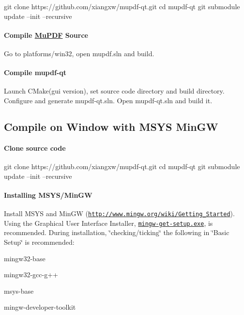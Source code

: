 \begin{DoxyVerb}git clone https://github.com/xiangxw/mupdf-qt.git
cd mupdf-qt
git submodule update --init --recursive
\end{DoxyVerb}


\paragraph*{Compile \hyperlink{namespace_mu_p_d_f}{Mu\-P\-D\-F} Source}

Go to platforms/win32, open mupdf.\-sln and build.

\paragraph*{Compile mupdf-\/qt}

Launch C\-Make(gui version), set source code directory and build directory. Configure and generate mupdf-\/qt.\-sln. Open mupdf-\/qt.\-sln and build it.

\subsection*{Compile on Window with M\-S\-Y\-S Min\-G\-W}

\paragraph*{Clone source code}

\begin{DoxyVerb}git clone https://github.com/xiangxw/mupdf-qt.git
cd mupdf-qt
git submodule update --init --recursive
\end{DoxyVerb}


\paragraph*{Installing M\-S\-Y\-S/\-Min\-G\-W}

Install M\-S\-Y\-S and Min\-G\-W (\href{http://www.mingw.org/wiki/Getting_Started}{\tt http\-://www.\-mingw.\-org/wiki/\-Getting\-\_\-\-Started}). Using the Graphical User Interface Installer, \href{http://sourceforge.net/projects/mingw/files/Installer/mingw-get-setup.exe/download}{\tt mingw-\/get-\/setup.\-exe}, is recommended. During installation, \char`\"{}checking/ticking\char`\"{} the following in \char`\"{}\-Basic Setup\char`\"{} is recommended\-:
\begin{DoxyEnumerate}
\item mingw32-\/base
\item mingw32-\/gcc-\/g++
\item msys-\/base
\item mingw-\/developer-\/toolkit
\end{DoxyEnumerate}

